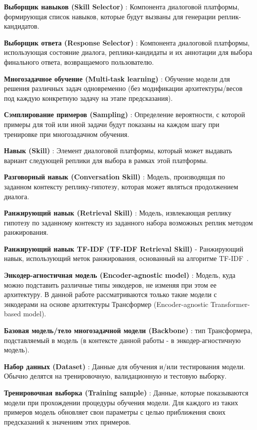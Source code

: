 \textbf{Выборщик навыков (Skill Selector)} : Компонента диалоговой платформы, формирующая список навыков, которые будут вызваны для генерации реплик-кандидатов.

\textbf{Выборщик ответа (Response Selector)} : Компонента диалоговой платформы, использующая состояние диалога, реплики-кандидаты и их аннотации для выбора финального ответа, возвращаемого пользователю.

\textbf{Многозадачное обучение (Multi-task learning)} : Обучение модели для решения различных задач одновременно (без модификации архитектуры/весов под каждую конкретную задачу на этапе предсказания).

\textbf{Сэмплирование примеров (Sampling)} : Определение вероятности, с которой примеры  для той или иной задачи будут показаны на каждом шагу при тренировке при многозадачном обучения. 

\textbf{Навык (Skill)} : Элемент диалоговой платформы, который может выдавать вариант следующей реплики для выбора в рамках этой платформы. 

\textbf{Разговорный навык (Conversation Skill)} : Модель, производящая по заданном контексту реплику-гипотезу, которая может являться продолжением диалога.

\textbf{Ранжирующий навык (Retrieval Skill)} : Модель, извлекающая реплику гипотезу по заданному контексту из заданного набора возможных реплик методом ранжирования.

\textbf{Ранжирующий навык TF-IDF (TF-IDF Retrieval Skill)} - Ранжирующий навык, использующий меток ранжирования, основанный на алгоритме TF-IDF~\cite{tfidf}. 

\textbf{Энкодер-агностичная модель (Encoder-agnostic model)} : Модель, куда можно подставить различные типы энкодеров, не  изменяя при этом ее архитектуру. В данной работе рассматриваются только такие модели с энкодерами на основе архитектуры Трансформер (Encoder-agnostic Transformer-based model).

\textbf{Базовая модель/тело многозадачной модели (Backbone)} : тип Трансформера, подставляемый в модель (в контексте данной работы - в энкодер-агностичную модель).

\textbf{Набор данных (Dataset)} : Данные для обучения и/или тестирования модели. Обычно делятся на тренировочную, валидационную и тестовую выборку. 

\textbf{Тренировочная выборка (Training sample)} : Данные, которые показываются модели при прохождении процедуры обучения модели. Для каждого из таких примеров модель обновляет свои параметры с целью приближения своих предсказаний к значениям этих примеров.

